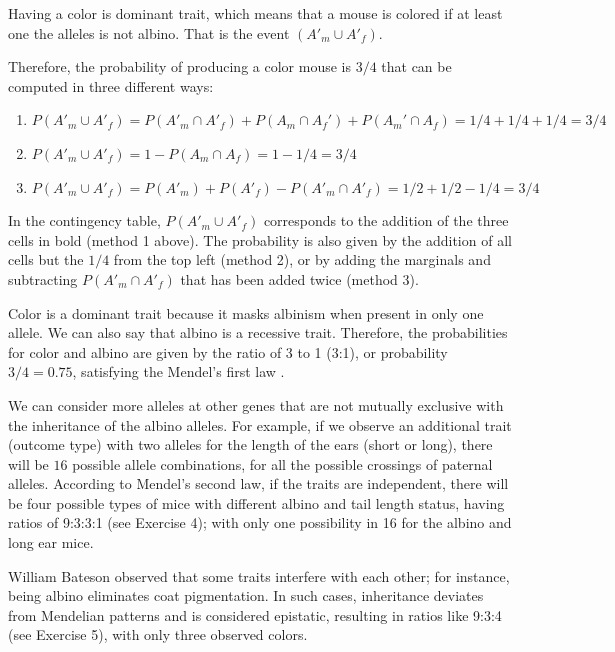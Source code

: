 \documentclass[
]{book}
\begin{document}
Having a color is dominant trait, which means that a mouse is colored if at least one the alleles is not albino. That is the event \((A'_m \cup A'_f)\).

Therefore, the probability of producing a color mouse is \(3/4\) that can be computed in three different ways:

\begin{enumerate}
\def\labelenumi{\arabic{enumi})}
\item
  \(P( A'_m \cup A'_f)=P(A'_m \cap A'_f)+P(A_m\cap A_f')+P(A_m'\cap A_f)=1/4+1/4+1/4=3/4\)
\item
  \(P(A'_m \cup A'_f)=1-P(A_m\cap A_f)= 1-1/4=3/4\)
\item
  \(P( A'_m \cup A'_f)=P(A'_m) + P(A'_f) - P(A'_m\cap A'_f)=1/2+1/2-1/4=3/4\)
\end{enumerate}

In the contingency table, \(P( A'_m \cup A'_f)\) corresponds to the addition of the three cells in bold (method 1 above). The probability is also given by the addition of all cells but the \(1/4\) from the top left (method 2), or by adding the marginals and subtracting \(P(A'_m\cap A'_f)\) that has been added twice (method 3).

Color is a dominant trait because it masks albinism when present in only one allele. We can also say that albino is a recessive trait. Therefore, the probabilities for color and albino are given by the ratio of 3 to 1 (3:1), or probability \(3/4=0.75\), satisfying the Mendel's first law \citep{mendel1901experiments}.

We can consider more alleles at other genes that are not mutually exclusive with the inheritance of the albino alleles. For example, if we observe an additional trait (outcome type) with two alleles for the length of the ears (short or long), there will be \(16\) possible allele combinations, for all the possible crossings of paternal alleles. According to Mendel's second law, if the traits are independent, there will be four possible types of mice with different albino and tail length status, having ratios of 9:3:3:1 (see Exercise 4); with only one possibility in 16 for the albino and long ear mice.

William Bateson observed that some traits interfere with each other; for instance, being albino eliminates coat pigmentation. In such cases, inheritance deviates from Mendelian patterns and is considered epistatic, resulting in ratios like 9:3:4 (see Exercise 5), with only three observed colors.
\end{document}
